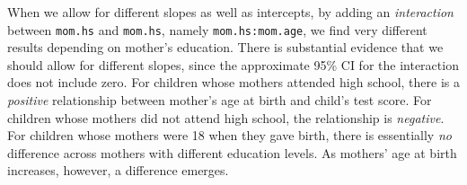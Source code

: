 \documentclass[addpoints,12pt]{exam}\usepackage[]{graphicx}\usepackage[]{color}
\newenvironment{knitrout}{}{} %
\begin{document}
\begin{questions}
\begin{parts}
\begin{solution}
\begin{knitrout}
\end{knitrout}
When we allow for different slopes as well as intercepts, by adding an \emph{interaction} between \texttt{mom.hs} and \texttt{mom.hs}, namely \texttt{mom.hs:mom.age}, we find very different results depending on mother's education. There is substantial evidence that we should allow for different slopes, since the approximate 95\% CI for the interaction does not include zero. For children whose mothers attended high school, there is a \emph{positive} relationship between mother's age at birth and child's test score. For children whose mothers did not attend high school, the relationship is \emph{negative}. For children whose mothers were 18 when they gave birth, there is essentially \emph{no} difference across mothers with different education levels. As mothers' age at birth increases, however, a difference emerges.
\end{solution}
	\end{parts}

\end{questions}
\end{document}
